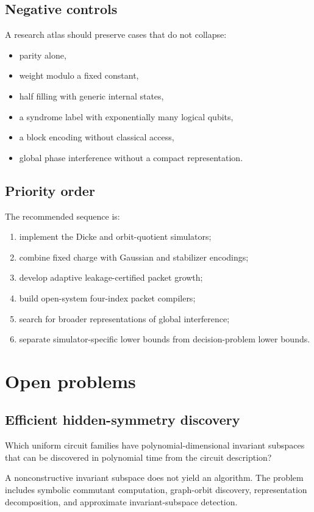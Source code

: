\subsection{Negative controls}
A research atlas should preserve cases that do not collapse:

\begin{itemize}
\item parity alone,
\item weight modulo a fixed constant,
\item half filling with generic internal states,
\item a syndrome label with exponentially many logical qubits,
\item a block encoding without classical access,
\item global phase interference without a compact representation.
\end{itemize}

\subsection{Priority order}
The recommended sequence is:

{\small
\begin{enumerate}[nosep,leftmargin=*,label=\arabic*.]
\item implement the Dicke and orbit-quotient simulators;
\item combine fixed charge with Gaussian and stabilizer encodings;
\item develop adaptive leakage-certified packet growth;
\item build open-system four-index packet compilers;
\item search for broader representations of global interference;
\item separate simulator-specific lower bounds from decision-problem lower bounds.
\end{enumerate}
}

\section{Open problems}
\label{s:ch:open-problems}

\subsection{Efficient hidden-symmetry discovery}
\begin{question}
Which uniform circuit families have polynomial-dimensional invariant subspaces that can be discovered in polynomial time from the circuit description?
\end{question}
A nonconstructive invariant subspace does not yield an algorithm. The problem includes symbolic commutant computation, graph-orbit discovery, representation decomposition, and approximate invariant-subspace detection.



